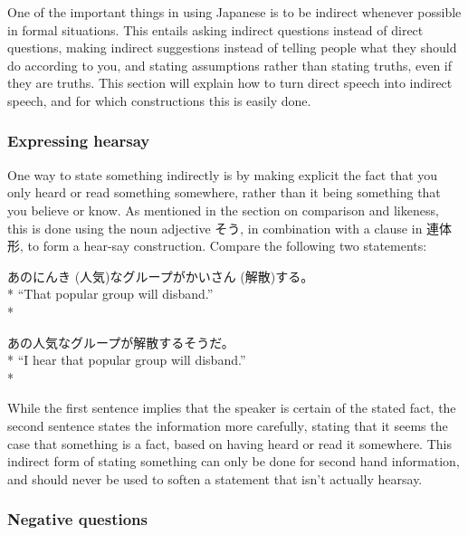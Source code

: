 \documentclass[11pt, b5paper, twoside, openright, onecolumn]{book}
\makeatletter
\newcommand*{\rubystack}[2]{{\relscale{0.5}%
  \begin{tabular}[b]{@{}c@{}}%
    {#1}\\%
   {\textscale{2}{#2}}%
  \end{tabular}}%
}
\DeclareRobustCommand*{\ruby}[2]{%
  \mbox{%
    \setlength{\parskip}{0ex}%
    \BeginAccSupp{method=pdfstringdef,ActualText={#1}}%
      \rubystack{\phantom{#2}}{#1}%
      \llap{%
        \rubystack{#2}{\phantom{#1}}%
      }%
    \EndAccSupp{}%
  }%
}
\renewcommand*{\ruby}[2]{#2 (#1)}%
\newenvironment{exampleblock}{
\setlength{\parindent}{0.6in}
\begin{minipage}[t]{\dimexpr\textwidth-\parindent}}
{\end{minipage}}
\makeatother
\begin{document}
One of the important things in using Japanese is to be indirect whenever possible in formal situations. This entails asking indirect questions instead of direct questions‚ making indirect suggestions instead of telling people what they should do according to you‚ and stating assumptions rather than stating truths‚ even if they are truths. This section will explain how to turn direct speech into indirect speech‚ and for which constructions this is easily done.

\subsubsection{Expressing hearsay}

One way to state something indirectly is by making explicit the fact that you only heard or read something somewhere‚ rather than it being something that you believe or know. As mentioned in the section on comparison and likeness‚ this is done using the noun adjective そう‚ in combination with a clause in 連体形‚ to form a hear-say construction. Compare the following two statements:

\vspace{0.4cm}
\begin{exampleblock}
あの\ruby{人気}{にんき}なグループが\ruby{解散}{かいさん}する。 \\* 
“That popular group will disband.” \\* 
\end{exampleblock}
\vspace{0.2cm}

\begin{exampleblock}
あの人気なグループが解散するそうだ。 \\* 
“I hear that popular group will disband.” \\* 
\end{exampleblock}
\vspace{0.2cm}

While the first sentence implies that the speaker is certain of the stated fact‚ the second sentence states the information more carefully‚ stating that it seems the case that something is a fact‚ based on having heard or read it somewhere. This indirect form of stating something can only be done for second hand information‚ and should never be used to soften a statement that isn’t actually hearsay.

\subsubsection{Negative questions}
\end{document}
